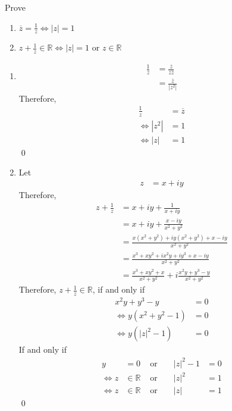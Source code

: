 \documentclass[fleqn, a4paper, 11pt, oneside]{amsart}
\theoremstyle{definition}
\theoremstyle{theorem}
\begin{document}
\setcounter{question}{3}
\begin{question}
	Prove
	\begin{enumerate}
		\item $\overline{z} = \frac{1}{z} \iff |z| = 1$
		\item $z + \frac{1}{z} \in \mathbb{R} \iff |z| = 1 \text{ or } z \in \mathbb{R}$
	\end{enumerate}
\end{question}

\begin{solution}
	\begin{enumerate}[leftmargin=*]
		\item
			\begin{align*}
				\frac{1}{z} & = \frac{\overline{z}}{z \overline{z}} \\
                                            & = \frac{\overline{z}}{|z^2|}
			\end{align*}
			Therefore,
			\begin{align*}
				\frac{1}{z} & = \overline{z} \\
				\iff |z^2|  & = 1            \\
				\iff |z|    & = 1
			\end{align*}
			\qed
		\item
			Let
			\begin{align*}
				z & = x + iy
			\end{align*}
			Therefore,
			\begin{align*}
				z + \frac{1}{z} & = x + i y + \frac{1}{x + i y}                                 \\
                                                & = x + i y + \frac{x - i y}{x^2 + y^2}                         \\
                                                & = \frac{x (x^2 + y^2) + i y (x^2 + y^2) + x - i y}{x^2 + y^2} \\
                                                & = \frac{x^3 + x y^2 + i x^2 y + i y^3 + x - i y}{x^2 + y^2}   \\
                                                & = \frac{x^3 + x y^2 + x}{x^2 + y^2} + i \frac{x^2 y + y^3 - y}{x^2 + y^2}
			\end{align*}
			Therefore, $z + \frac{1}{z} \in \mathbb{R}$, if and only if
			\begin{align*}
				x^2 y + y^3 - y        & = 0 \\
				\iff y (x^2 + y^2 - 1) & = 0 \\
				\iff y (|z|^2 - 1)     & = 0
			\end{align*}
			If and only if
			\begin{align*}
				y      & = 0            & \text{ or } &  & |z|^2 - 1 & = 0 \\
				\iff z & \in \mathbb{R} & \text{ or } &  & |z|^2     & = 1 \\
				\iff z & \in \mathbb{R} & \text{ or } &  & |z|       & = 1
			\end{align*}
			\qed
	\end{enumerate}
\end{solution}
\end{document}
